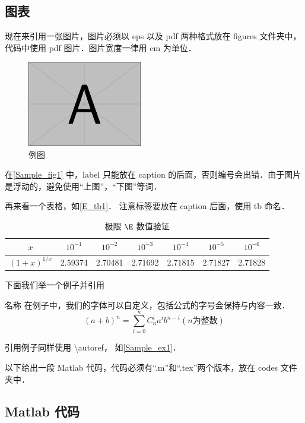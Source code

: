 \subsection{图表}

现在来引用一张图片，图片必须以 eps 以及 pdf 两种格式放在 figures 文件夹中，代码中使用 pdf 图片．图片宽度一律用 cm 为单位．
\begin{figure}[ht]
\centering
\includegraphics[width=5cm]{./figures/Sample.pdf}
\caption{例图} \label{Sample_fig1}
\end{figure}
在\autoref{Sample_fig1} 中，label 只能放在 caption 的后面，否则编号会出错．由于图片是浮动的，避免使用“上图”，“下图”等词．

再来看一个表格，如\autoref{E_tb1}． 注意标签要放在 caption 后面，使用 tb 命名．
\begin{table}[ht]
\centering
\caption{极限 $\E$ 数值验证}\label{E_tb1}
\begin{tabular}{|c|c|c|c|c|c|c|}
\hline
$x$ & ${10^{ - 1}}$ & ${10^{ - 2}}$ & ${10^{ - 3}}$ & ${10^{ - 4}}$ & ${10^{ - 5}}$ & ${10^{ - 6}}$ \\
\hline
${\left( {1 + x} \right)^{1/x}}$ & 2.59374 & 2.70481 & 2.71692 & 2.71815 & 2.71827 & 2.71828 \\
\hline
\end{tabular}
\end{table}

下面我们举一个例子并引用

\begin{exam}{名称}\label{Sample_ex1}
在例子中，我们的字体可以自定义，包括公式的字号会保持与内容一致．
\begin{equation}
(a+b)^n = \sum_{i=0}^n C_n^i a^i b^{n-i}(n\text{为整数})
\end{equation}
\end{exam}
引用例子同样使用 \textbackslash autoref， 如\autoref{Sample_ex1}． 


以下给出一段 Matlab 代码，代码必须有“.m”和“.tex”两个版本，放在 codes 文件夹中．

\subsection{Matlab 代码}

